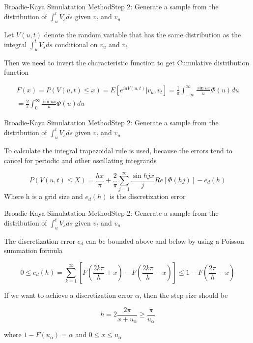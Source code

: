 \begin{frame}{Broadie-Kaya Simulatation Method}{Step 2:  Generate a sample from the distribution of $\int_{u}^t V_s ds$ given $v_t$ and $v_u$}
    
    Let $V(u,t)$  denote the random
    variable that has the same distribution as the integral $\int_{u}^t V_s ds$ conditional on $v_u$ and $v_t$
    
    Then we need to invert the characteristic function to get Cumulative distribution function
    
    \begin{multline}
        F(x) = P(V(u, t) \leq x) = E\left[ e^{iaV(u,t)} \Big| v_u, v_t\right] = \frac{1}{\pi} \int_{-\infty}^\infty \frac{\sin ux}{u} \Phi(u) du \\
        = \frac{2}{\pi} \int_{0}^\infty \frac{\sin ux}{u} \Phi(u) du
    \end{multline}
    
    
\end{frame}

\begin{frame}{Broadie-Kaya Simulatation Method}{Step 2:  Generate a sample from the distribution of $\int_{u}^t V_s ds$ given $v_t$ and $v_u$}

    To calculate the integral trapezoidal rule is used, because the errors tend to cancel  for periodic and other oscillating integrands

    \begin{equation}
        P(V(u, t) \leq X) = \frac{hx}{\pi} + \frac{2}{\pi} \sum_{j=1}^\infty \frac{\sin hjx}{j} Re[\Phi(hj)] - e_d(h)
    \end{equation}
    Where h is a grid size and $e_d(h)$ is the discretization   error

\end{frame}

\begin{frame}{Broadie-Kaya Simulatation Method}{Step 2:  Generate a sample from the distribution of $\int_{u}^t V_s ds$ given $v_t$ and $v_u$}

    The discretization error $e_d$ can be bounded above and
below by using a Poisson summation formula 

    \begin{equation}
        0 \leq e_d(h) = \sum_{k=1}^\infty[ F(\frac{2k\pi}{h} + x) - F(\frac{2k\pi}{h} - x)] \leq 1 - F(\frac{2\pi}{h} - x)
    \end{equation}

    If we want to achieve a discretization error $\alpha$, then the
    step size should be

    \begin{equation}
        h = 2\frac{2\pi}{x+ u_\alpha} \geq \frac{\pi}{u_\alpha}
    \end{equation}

    where $1-F(u_\alpha) = \alpha$ and $0 \leq x \leq u_\alpha$


\end{frame}



